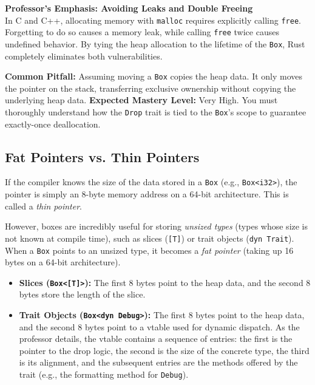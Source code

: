 \begin{examprioritybox}
\textbf{Professor's Emphasis: Avoiding Leaks and Double Freeing} \\
In C and C++, allocating memory with \texttt{malloc} requires explicitly calling \texttt{free}. Forgetting to do so causes a memory leak, while calling \texttt{free} twice causes undefined behavior. By tying the heap allocation to the lifetime of the \texttt{Box}, Rust completely eliminates both vulnerabilities.

\textbf{Common Pitfall:} Assuming moving a \texttt{Box} copies the heap data. It only moves the pointer on the stack, transferring exclusive ownership without copying the underlying heap data.
\textbf{Expected Mastery Level:} Very High. You must thoroughly understand how the \texttt{Drop} trait is tied to the \texttt{Box}'s scope to guarantee exactly-once deallocation.
\end{examprioritybox}

\subsection*{Fat Pointers vs. Thin Pointers}
If the compiler knows the size of the data stored in a \texttt{Box} (e.g., \texttt{Box<i32>}), the pointer is simply an 8-byte memory address on a 64-bit architecture. This is called a \textit{thin pointer}.

However, boxes are incredibly useful for storing \textit{unsized types} (types whose size is not known at compile time), such as slices (\texttt{[T]}) or trait objects (\texttt{dyn Trait}). When a \texttt{Box} points to an unsized type, it becomes a \textit{fat pointer} (taking up 16 bytes on a 64-bit architecture). 
\begin{itemize}
    \item \textbf{Slices (\texttt{Box<[T]>}):} The first 8 bytes point to the heap data, and the second 8 bytes store the length of the slice.
    \item \textbf{Trait Objects (\texttt{Box<dyn Debug>}):} The first 8 bytes point to the heap data, and the second 8 bytes point to a vtable used for dynamic dispatch. As the professor details, the vtable contains a sequence of entries: the first is the pointer to the drop logic, the second is the size of the concrete type, the third is its alignment, and the subsequent entries are the methods offered by the trait (e.g., the formatting method for \texttt{Debug}).
\end{itemize}


